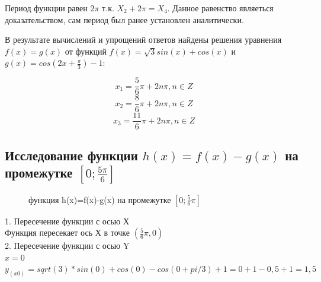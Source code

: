 \documentclass[russian,utf8,nocolumnxxxi,nocolumnxxxii]{eskdtext}
\begin{document}
\normalsize Период функции равен $2\pi$ т.к. $X_2+2\pi=X_4$. Данное равенство являеться доказательством, сам период был ранее установлен аналитически.
\par
В результате вычислений и упрощений ответов найдены решения уравнения  $f(x)=g(x)$ от функций $f(x)=\sqrt{3}sin(x)+cos(x)$ и $g(x)=cos(2x+\frac{\pi}{3})-1$:
\par
$$x_1=\frac{5}{6}\pi+2n\pi,n\in Z$$
$$x_2=\frac{8}{6}\pi+2n\pi,n\in Z$$
$$x_3=\frac{11}{6}\pi+2n\pi,n\in Z$$







\subsection{Исследование функции $h(x)=f(x)-g(x)$ на промежутке $[0;\frac{5\pi}{6}]$}


\begin{figure}[H]
\caption{ функция h(x)=f(x)-g(x) на промежутке $[0;\frac{5}{6}\pi]$}
\end{figure}


1. Пересечение функции с осью Х \\
Функция пересекает ось Х в точке $(\frac{5}{6}\pi,0)$ \\


2. Пересечение функции с осью Y \\
$x=0$ \\
$y_{(x0)}=sqrt(3)*sin(0)+cos(0)-cos(0 + pi/3)+1=0+1-0,5+1=1,5$ \\
\end{document}
